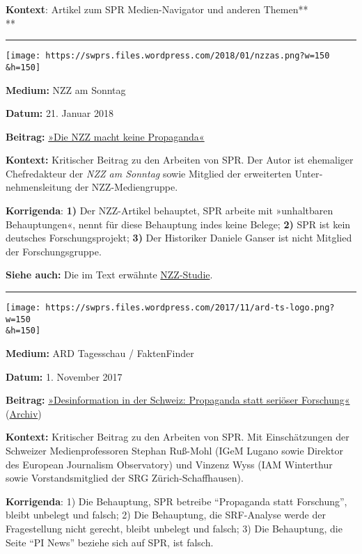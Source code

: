 \textbf{Kontext}: Artikel zum SPR Medien-Navigator und anderen
Themen**\\
**

\begin{center}\rule{0.5\linewidth}{\linethickness}\end{center}

\texttt{[image: https://swprs.files.wordpress.com/2018/01/nzzas.png?w=150\\\&h=150]}

\textbf{Medium:} NZZ am Sonntag

\textbf{Datum:} 21. Januar 2018

\textbf{Beitrag:}
\href{https://swprs.files.wordpress.com/2019/10/nzzas_180121s71.pdf}{»Die
NZZ macht keine Propaganda«}

\textbf{Kontext:} Kritischer Beitrag zu den Arbeiten von SPR. Der Autor
ist ehemaliger Chefredakteur der \emph{NZZ am Sonntag} sowie Mitglied
der erweiterten Unter­nehmens­leitung der NZZ-Mediengruppe.

\textbf{Korrigenda}: \textbf{1)} Der NZZ-Artikel behauptet, SPR arbeite
mit »unhaltbaren Behauptungen«, nennt für diese Behauptung indes keine
Belege; \textbf{2)} SPR ist kein deutsches Forschungsprojekt;
\textbf{3)} Der Historiker Daniele Ganser ist nicht Mitglied der
Forschungsgruppe.

\textbf{Siehe auch:} Die im Text erwähnte
\href{https://swprs.org/die-nzz-studie/}{NZZ-Studie}.

\begin{center}\rule{0.5\linewidth}{\linethickness}\end{center}

\texttt{[image: https://swprs.files.wordpress.com/2017/11/ard-ts-logo.png?w=150\\\&h=150]}

\textbf{Medium:} ARD Tagesschau / FaktenFinder

\textbf{Datum:} 1. November 2017

\textbf{Beitrag:}
\href{https://faktenfinder.tagesschau.de/ausland/schweiz-desinformation-101.html}{»Desinformation
in der Schweiz: Propaganda statt seriöser Forschung«}
(\href{https://archive.fo/kRg3n}{Archiv})

\textbf{Kontext:} Kritischer Beitrag zu den Arbeiten von SPR. Mit
Einschätzungen der Schweizer Medien­professoren Stephan Ruß-Mohl (IGeM
Lugano sowie Direktor des European Journalism Observatory) und Vinzenz
Wyss (IAM Winterthur sowie Vorstands­mitglied der SRG
Zürich-Schaffhausen).

\textbf{Korrigenda}: 1) Die Behauptung, SPR betreibe ``Propaganda statt
Forschung'', bleibt unbelegt und falsch; 2) Die Behauptung, die
SRF-Analyse werde der Fragestellung nicht gerecht, bleibt unbelegt und
falsch; 3) Die Behauptung, die Seite ``PI News'' beziehe sich auf SPR,
ist falsch.

